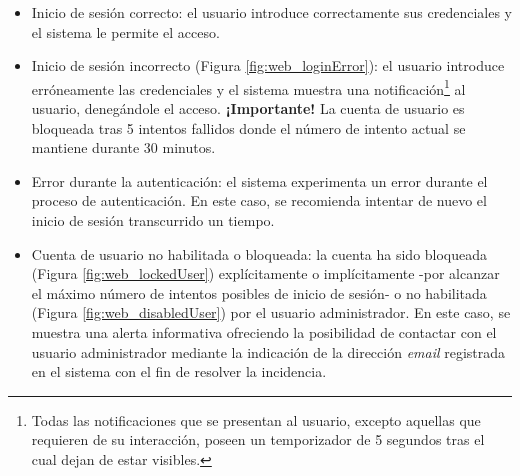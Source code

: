 \documentclass[12pt,a4paper, twoside]{report}
\begin{document}
	\begin{itemize}
		\item Inicio de sesión correcto: el usuario introduce correctamente sus credenciales y el sistema le permite el acceso.
		\item Inicio de sesión incorrecto (Figura \ref{fig:web_loginError}): el usuario introduce erróneamente las credenciales y el sistema muestra una notificación\footnote{Todas las notificaciones que se presentan al usuario, excepto aquellas que requieren de su interacción, poseen un temporizador de 5 segundos tras el cual dejan de estar visibles.} al usuario, denegándole el acceso. \textbf{¡Importante!} La cuenta de usuario es bloqueada tras 5 intentos fallidos donde el número de intento actual se mantiene durante 30 minutos.
		
		
		\item Error durante la autenticación: el sistema experimenta un error durante el proceso de autenticación. En este caso, se recomienda intentar de nuevo el inicio de sesión transcurrido un tiempo.
				
		\item Cuenta de usuario no habilitada o bloqueada: la cuenta ha sido bloqueada (Figura \ref{fig:web_lockedUser}) explícitamente o implícitamente -por alcanzar el máximo número de intentos posibles de inicio de sesión-  o no habilitada (Figura \ref{fig:web_disabledUser}) por el usuario administrador. En este caso, se muestra una alerta informativa ofreciendo la posibilidad de contactar con el usuario administrador mediante la indicación de la dirección \textit{email} registrada en el sistema con el fin de resolver la incidencia.
				


\end{itemize}
\end{document}
